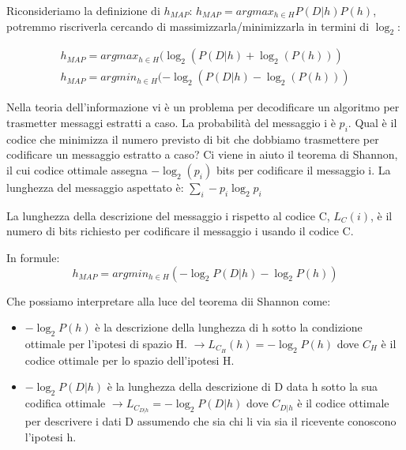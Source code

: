 \documentclass[a4paper]{extarticle}
\begin{document}
\begin{center}

\end{center}

Riconsideriamo la definizione di $h_{MAP}$: $h_{MAP} = argmax_{h\in H} P(D|h)P(h)$, potremmo riscriverla cercando di massimizzarla/minimizzarla in termini di $\log_2$:

\begin{equation*}
\begin{split}
h_{MAP} = argmax_{h \in H}(\log_2(P(D|h) + \log_2(P(h))) \\
h_{MAP} = argmin_{h \in H}(- \log_2(P(D|h) - \log_2(P(h)))
\end{split}
\end{equation*}

Nella teoria dell'informazione vi è un problema per decodificare un algoritmo per trasmetter messaggi estratti a caso. La probabilità del messaggio i è $p_i$. Qual è il codice che minimizza il numero previsto di bit che dobbiamo trasmettere per codificare un messaggio estratto a caso? Ci viene in aiuto il teorema di Shannon, il cui codice ottimale assegna $-\log_2(p_i)$ bits per codificare il messaggio i. La lunghezza del messaggio aspettato è: $\sum\limits_i -p_i \log_2 p_i$ 

La lunghezza della descrizione del messaggio i rispetto al codice C, $L_C (i)$, è il numero di bits richiesto per codificare il messaggio i usando il codice C.

In formule:
\begin{equation*}
h_{MAP} = argmin_{h \in H} (- \log_2 P(D|h) - \log_2 P(h))
\end{equation*} 

Che possiamo interpretare alla luce del teorema dii Shannon come:
\begin{itemize}
\item $-\log_2 P(h)$ è la descrizione della lunghezza di h sotto la condizione ottimale per l'ipotesi di spazio H. $\rightarrow L_{C_H}(h) = - \log_2P(h)$ dove $C_H$ è il codice ottimale per lo spazio dell'ipotesi H.
\item  $-\log_2 P(D|h)$ è la lunghezza della descrizione di D data h sotto la sua codifica ottimale $\rightarrow L_{C_{D|h}} = - \log_2 P(D|h)$ dove $C_{D|h}$ è il codice ottimale per descrivere i dati D assumendo che sia chi li via sia il ricevente conoscono l'ipotesi h.
\end{itemize}
\end{document}
